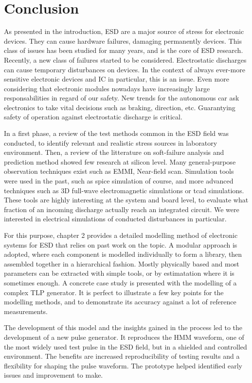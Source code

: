 \chapter{Conclusion}


As presented in the introduction, ESD are a major source of stress for electronic devices.
They can cause hardware failures, damaging permanently devices.
This class of issues has been studied for many years, and is the core of ESD research.
Recently, a new class of failures started to be considered.
Electrostatic discharges can cause temporary disturbances on devices.
In the context of always ever-more sensitive electronic devices and IC in particular, this is an issue.
Even more considering that electronic modules nowadays have increasingly large responsabilities in regard of our safety.
New trends for the autonomous car ask electronics to take vital decisions such as braking, direction, etc.
Guarantying safety of operation against electrostatic discharge is critical.

In a first phase, a review of the test methods common in the ESD field was conducted, to identify relevant and realistic stress sources in laboratory environment.
Then, a review of the litterature on soft-failure analysis and prediction method showed few research at silicon level.
Many general-purpose observation techniques exist such as EMMI, Near-field scan.
Simulation tools were used in the past, such as \gls{spice} simulation of course, and more advanced techniques such as 3D full-wave electromagnetic simulations or \gls{tcad} simulations.
These tools are highly interesting at the system and board level, to evaluate what fraction of an incoming discharge actually reach an integrated circuit.
We were interested in electrical simulations of conducted disturbances in particular.

For this purpose, chapter 2 provides a detailed modelling method of electronic systems for ESD that relies on past work on the topic.
A modular approach is adopted, where each component is modelled individually to form a library, then assembled together in a hierarchical fashion.
Mostly physically based and most parameters can be extracted with simple tools, or by estimatation where it is sometimes enough.
A concrete case study is presented with the modelling of a complex TLP generator.
It is perfect to illustrate a few key points for the modelling methods, and to demonstrate its accuracy against a lot of reference measurements.

The development of this model and the insights gained in the process led to the development of a new pulse generator.
It reproduces the HMM waveform, one of the most widely used test pulse in the ESD field, but in a shielded and controlled environment.
The benefits are increased reproducibility of testing results and a flexibility for shaping the pulse waveform.
The prototype helped identified early issues and improvement to make.

